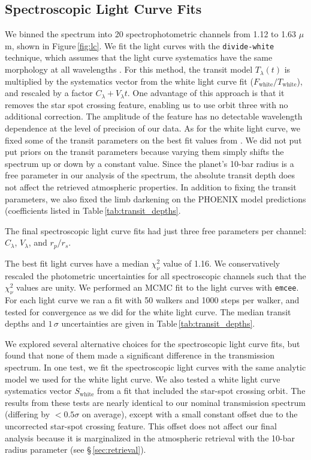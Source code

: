 \documentclass[twocolumn, trackchanges]{aastex61}
\begin{document}
\subsection{Spectroscopic Light Curve Fits}
We binned the spectrum into 20 spectrophotometric channels from 1.12 to 1.63 $\mu$m, shown in Figure\,\ref{fig:lc}. We fit the light curves with the \texttt{divide-white} technique, which assumes that the light curve systematics have the same morphology at all wavelengths \citep{stevenson14c, kreidberg14a}. For this method, the transit model $T_\lambda(t)$ is multiplied by the systematics vector from the white light curve fit ($F_\mathrm{white}/T_\mathrm{white}$), and rescaled by a factor $C_\lambda + V_\lambda t$.  One advantage of this approach is that it removes the star spot crossing feature, enabling us to use orbit three with no additional correction. The amplitude of the feature has no detectable wavelength dependence at the level of precision of our data.  As for the white light curve, we fixed some of the transit parameters on the best fit values from \cite{dai17}. We did not put put priors on the transit parameters because varying them simply shifts the spectrum up or down by a constant value. Since the planet's 10-bar radius is a free parameter in our analysis of the spectrum, the absolute transit depth does not affect the retrieved atmospheric properties. In addition to fixing the transit parameters, we also fixed the limb darkening on the PHOENIX model predictions (coefficients listed in Table\,\ref{tab:transit_depths}. 

The final spectroscopic light curve fits had just three free parameters per channel: $C_\lambda$, $V_\lambda$, and $r_p/r_s$.  

The best fit light curves have a median $\chi^2_\nu$ value of 1.16.  We conservatively rescaled the photometric uncertainties for all spectroscopic channels such that the $\chi^2_\nu$ values are unity. We performed an MCMC fit to the light curves with \texttt{emcee}.  For each light curve we ran a fit with 50 walkers and 1000 steps per walker, and tested for convergence as we did for the white light curve. The median transit depths and $1\,\sigma$ uncertainties are given in Table\,\ref{tab:transit_depths}. 

We explored several alternative choices for the spectroscopic light curve fits, but found that none of them made a significant difference in the transmission spectrum. In one test, we fit the spectroscopic light curves with the same analytic model we used for the white light curve. We also tested a white light curve systematics vector $S_\mathrm{white}$ from a fit that included the star-spot crossing orbit. The results from these tests are nearly identical to our nominal transmission spectrum (differing by $<0.5\sigma$ on average), except with a small constant offset due to the uncorrected star-spot crossing feature. This offset does not affect our final analysis because it is marginalized in the atmospheric retrieval with the 10-bar radius parameter (see \S\,\ref{sec:retrieval}).
\end{document}
